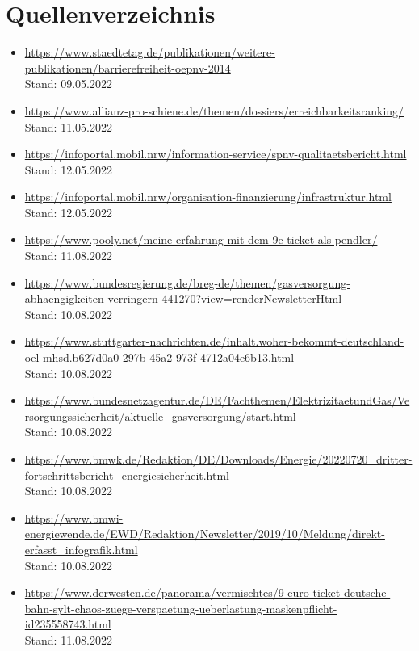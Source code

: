 \documentclass[a4paper,12pt]{scrartcl}
\begin{document}
\newpage
\section{Quellenverzeichnis}
\begin{itemize}
\item \url{https://www.staedtetag.de/publikationen/weitere-publikationen/barrierefreiheit-oepnv-2014} \\ Stand: 09.05.2022
\item \url{https://www.allianz-pro-schiene.de/themen/dossiers/erreichbarkeitsranking/} \\ Stand: 11.05.2022
\item \url{https://infoportal.mobil.nrw/information-service/spnv-qualitaetsbericht.html} \\ Stand: 12.05.2022
\item \url{https://infoportal.mobil.nrw/organisation-finanzierung/infrastruktur.html} \\ Stand: 12.05.2022
\item \url{https://www.pooly.net/meine-erfahrung-mit-dem-9e-ticket-als-pendler/} \\ Stand: 11.08.2022
\item \url{https://www.bundesregierung.de/breg-de/themen/gasversorgung-abhaengigkeiten-verringern-441270?view=renderNewsletterHtml} \\ Stand: 10.08.2022
\item \url{https://www.stuttgarter-nachrichten.de/inhalt.woher-bekommt-deutschland-oel-mhsd.b627d0a0-297b-45a2-973f-4712a04e6b13.html} \\ Stand: 10.08.2022
\item \url{https://www.bundesnetzagentur.de/DE/Fachthemen/ElektrizitaetundGas/Versorgungssicherheit/aktuelle_gasversorgung/start.html} \\ Stand: 10.08.2022
\item \url{https://www.bmwk.de/Redaktion/DE/Downloads/Energie/20220720_dritter-fortschrittsbericht_energiesicherheit.html} \\ Stand: 10.08.2022
\item \url{https://www.bmwi-energiewende.de/EWD/Redaktion/Newsletter/2019/10/Meldung/direkt-erfasst_infografik.html} \\ Stand: 10.08.2022
\item \url{https://www.derwesten.de/panorama/vermischtes/9-euro-ticket-deutsche-bahn-sylt-chaos-zuege-verspaetung-ueberlastung-maskenpflicht-id235558743.html} \\ Stand: 11.08.2022

\end{itemize}
\end{document}
